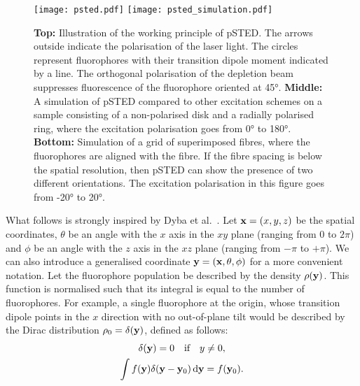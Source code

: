 \begin{figure}
	\centering
	\texttt{[image: psted.pdf]}
	\texttt{[image: psted\_simulation.pdf]}
	\caption{
		\textbf{Top:} Illustration of the working principle of pSTED. The arrows outside indicate the polarisation of the laser light. The circles represent fluorophores with their transition dipole moment indicated by a line. The orthogonal polarisation of the depletion beam suppresses fluorescence of the fluorophore oriented at \ang{45}.
		\textbf{Middle:} A simulation of pSTED compared to other excitation schemes on a sample consisting of a non-polarised disk and a radially polarised ring, where the excitation polarisation goes from \ang{0} to \ang{180}.
		\textbf{Bottom:} Simulation of a grid of superimposed fibres, where the fluorophores are aligned with the fibre. If the fibre spacing is below the spatial resolution, then pSTED can show the presence of two different orientations. The excitation polarisation in this figure goes from \ang{-20} to \ang{+20}.
	}
	\label{fig:psted principle}
\end{figure}

What follows is strongly inspired by Dyba et al.~\cite{Dyba2005}. Let $ \vb{x} = (x, y, z)$ be the spatial coordinates, $ \theta $ be an angle with the $ x $ axis in the $ xy $ plane (ranging from $ 0 $ to $ 2\pi$) and $ \phi $ be an angle with the $ z $ axis in the $ xz $ plane (ranging from $ -\pi $ to $+\pi$). We can also introduce a generalised coordinate $ \vb{y} = (\vb{x}, \theta, \phi) $ for a more convenient notation.
Let the fluorophore population be described by the density $ \rho(\vb{y}) $. This function is normalised such that its integral is equal to the number of fluorophores. For example, a single fluorophore at the origin, whose transition dipole points in the $ x $ direction with no out-of-plane tilt would be described by the Dirac distribution $ \rho_0 = \delta(\vb{y}) $, defined as follows:
\begin{gather}
	\delta(\vb{y}) = 0 \qq{if} y\neq0, \\
	\int f(\vb{y})\delta(\vb{y}-\vb{y}_0) \dd{\vb{y}} = f(\vb{y}_0).
\end{gather}

